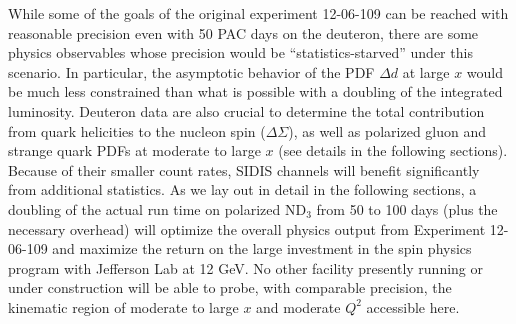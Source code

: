 While some of the goals of the original experiment 12-06-109 can be reached with reasonable precision even with 50 PAC days on the deuteron, there are some physics observables whose precision would be ``statistics-starved'' under this scenario. In particular, the asymptotic behavior of the PDF $\Delta d$ at large $x$ would be much less constrained than what is possible with a doubling of the integrated luminosity. Deuteron data are also crucial to determine the total contribution from quark helicities to the nucleon spin ($\Delta \Sigma$), as well as polarized gluon and strange quark PDFs at moderate to large $x$ (see details in the following sections). Because of their smaller count rates, SIDIS channels will benefit significantly from additional statistics. As we lay out in detail in the following sections, a doubling of the actual run time on polarized ND$_3$ from 50 to 100 days (plus the necessary overhead) will optimize the overall physics output from Experiment 12-06-109 and maximize the return on the large investment in the spin physics program with Jefferson Lab at 12 GeV.
No other facility presently running or under construction will be able to probe, with comparable precision, the kinematic region of moderate to large $x$ and moderate $Q^2$ accessible here.



